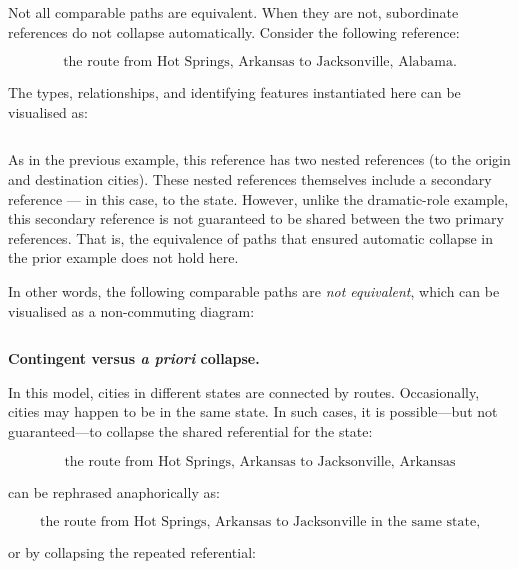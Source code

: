 Not all comparable paths are equivalent. When they are not, subordinate references do not collapse automatically. Consider the following reference:

\begin{equation*}
\text{the route from Hot Springs, Arkansas to Jacksonville, Alabama.}
\end{equation*}

The types, relationships, and identifying features instantiated here can be visualised as:

\begin{equation*}

\end{equation*}

\mynote
As in the previous example, this reference has two nested references (to the origin and destination cities). These nested references themselves include a secondary reference — in this case, to the state. However, unlike the dramatic-role example, this secondary reference is not guaranteed to be shared between the two primary references. That is, the equivalence of paths that ensured automatic collapse in the prior example does not hold here. 

In other words, the following comparable paths are \textit{not equivalent}, which can be visualised as a non-commuting diagram:

\begin{equation*}

\end{equation*}

\textbf{Contingent versus \textit{a priori} collapse.}  

In this model, cities in different states are connected by routes. Occasionally, cities may happen to be in the same state. In such cases, it is possible—but not guaranteed—to collapse the shared referential for the state:

\begin{equation*}
\text{the route from Hot Springs, Arkansas to Jacksonville, Arkansas}
\end{equation*}

can be rephrased anaphorically as:

\begin{equation*}
\text{the route from Hot Springs, Arkansas to Jacksonville in the same state,}
\end{equation*}

or by collapsing the repeated referential:

